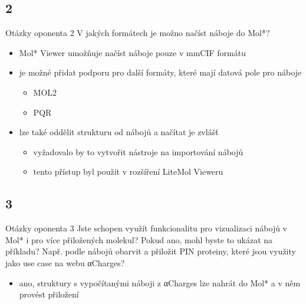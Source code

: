 \documentclass[
]{beamer}
\begin{document}
\subsection[2]{2}

\begin{frame}
  \begin{block}{Otázky oponenta 2}
    V jakých formátech je možno načíst náboje do Mol*?
  \end{block}
  \begin{itemize}
    \item Mol* Viewer umožňuje načíst náboje pouze v mmCIF formátu
    \item je možné přidat podporu pro další formáty, které mají datová pole pro náboje
    \begin{itemize}
      \item MOL2
      \item PQR
    \end{itemize}
    \item lze také oddělit strukturu od nábojů a načítat je zvlášť
    \begin{itemize}
      \item vyžadovalo by to vytvořit nástroje na importování nábojů 
      \item tento přístup byl použit v rozšíření LiteMol Vieweru
    \end{itemize}
  \end{itemize}
\end{frame}

\subsection[3]{3}

\begin{frame}
  \begin{block}{Otázky oponenta 3}
    Jste schopen využít funkcionalitu pro vizualizaci nábojů v Mol* i pro více přiložených molekul? Pokud ano, mohl byste to ukázat na příkladu? Např. podle nábojů obarvit a přiložit PIN proteiny, které jsou využity jako use case na webu αCharges?
  \end{block}
  \begin{itemize}
    \item ano, struktury s vypočítanými náboji z αCharges lze nahrát do Mol* a v něm provést přiložení
  \end{itemize}
\end{frame}
\end{document}

